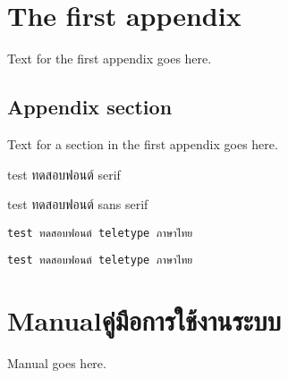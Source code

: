 \chapter{The first appendix}

Text for the first appendix goes here.

\section{Appendix section}

Text for a section in the first appendix goes here.

test ทดสอบฟอนต์ serif

\textsf{test ทดสอบฟอนต์ sans serif}

\ifenglish\else
\verb+test ทดสอบฟอนต์ teletype ภาษาไทย+

\texttt{test ทดสอบฟอนต์ teletype ภาษาไทย}
\fi

\chapter{\ifenglish Manual\else คู่มือการใช้งานระบบ\fi}

Manual goes here.
